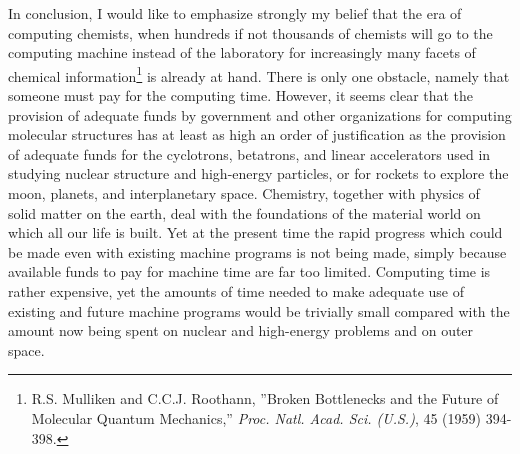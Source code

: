 \documentclass[11pt]{memoir}
\begin{document}
In conclusion, I would like to emphasize strongly my belief that the era of computing chemists, when hundreds if not thousands of chemists will go to the computing machine instead of the laboratory for increasingly many facets of chemical information\footnote{R.S. Mulliken and C.C.J. Roothann, ''Broken Bottlenecks and the Future of Molecular Quantum Mechanics,'' \emph{Proc. Natl. Acad. Sci. (U.S.)}, 45 (1959) 394-398.} is already at hand.  There is only one obstacle, namely that someone must pay for the computing time.  However, it seems clear that the provision of adequate funds by government and other organizations for computing molecular structures has at least as high an order of justification as the provision of adequate funds for the cyclotrons, betatrons, and linear accelerators used in studying nuclear structure and high-energy particles, or for rockets to explore the moon, planets, and interplanetary space.  Chemistry, together with physics of solid matter on the earth, deal with the foundations of the material world on which all our life is built. Yet at the present time the rapid progress which could be made even with existing machine programs is not being made, simply because available funds to pay for machine time are far too limited.  Computing time is rather expensive, yet the amounts of time needed to make adequate use of existing and future machine programs would be trivially small compared with the amount now being spent on nuclear and high-energy problems and on outer space.
\end{document}
